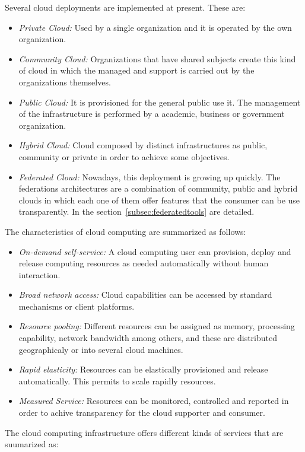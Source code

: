 Several cloud deployments are implemented at present. These are:
\begin{itemize}
\item \emph{Private Cloud:} Used by a single organization and it is operated by
  the own organization. 
\item \emph{Community Cloud:} Organizations that have shared subjects create
  this kind of cloud in which the managed and support is carried out by the
  organizations themselves.
\item \emph{Public Cloud:} It is provisioned for the general public use it. The
  management of the infrastructure is performed by a academic, business or
  government organization.
\item \emph{Hybrid Cloud:} Cloud composed by distinct infrastructures as public,
  community or private in order to achieve some objectives.
\item \emph{Federated Cloud:} Nowadays, this deployment is growing up
  quickly. The federations architectures are a combination of community, public
  and hybrid clouds in which each one of them offer features that the consumer can
  be use transparently. In the section~\ref{subsec:federatedtools} are detailed.
\end{itemize}

The characteristics of cloud computing are summarized as follows:
\begin{itemize}
\item \emph{On-demand self-service:} A cloud computing user can provision,
  deploy and release computing resources as needed automatically without human
  interaction.
\item \emph{Broad network access:} Cloud capabilities can be accessed by
  standard mechanisms or client platforms.
\item \emph{Resource pooling:} Different resources can be assigned as memory,
  processing capability, network bandwidth among others, and these are
  distributed geographicaly or into several cloud machines. 
\item \emph{Rapid elasticity:} Resources can be elastically provisioned and
  release automatically. This permits to scale rapidly resources.
\item \emph{Measured Service:} Resources can be monitored, controlled and
  reported in order to achive transparency for the cloud supporter and consumer.
\end{itemize}

The cloud computing infrastructure offers different kinds of services that are
suumarized as:

